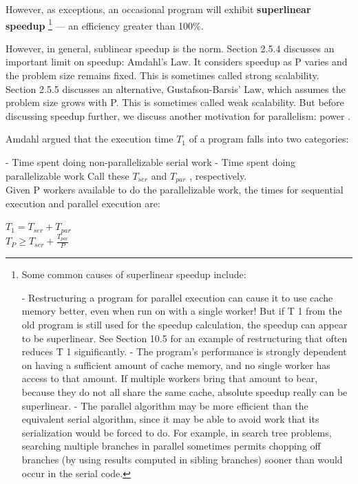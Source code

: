 However, as exceptions, an occasional program will exhibit \textbf{superlinear speedup} \footnote{Some common causes of superlinear speedup include:
	
	- Restructuring a program for parallel execution can cause it to use cache memory better, even when
	run on with a single worker! But if T 1 from the old program is still used for the speedup calculation,
	the speedup can appear to be superlinear. See Section 10.5 for an example of restructuring that often
	reduces T 1 significantly.
	- The program’s performance is strongly dependent on having a sufficient amount of cache memory,
	and no single worker has access to that amount. If multiple workers bring that amount to bear,
	because they do not all share the same cache, absolute speedup really can be superlinear.
	- The parallel algorithm may be more efficient than the equivalent serial algorithm, since it may be
	able to avoid work that its serialization would be forced to do. For example, in search tree problems,
	searching multiple branches in parallel sometimes permits chopping off branches (by using results
	computed in sibling branches) sooner than would occur in the serial code.} — an efficiency greater than 100\%. 

However, in general, sublinear speedup is the norm.
Section 2.5.4 discusses an important limit on speedup: Amdahl’s Law. It considers speedup as P varies and the problem size remains fixed. This is sometimes called strong scalability. Section 2.5.5 discusses an alternative, Gustafson-Barsis’ Law, which assumes the problem size grows with P.
This is sometimes called weak scalability. But before discussing speedup further, we discuss another
motivation for parallelism: power \cite{structparprog}.



Amdahl argued that the execution time \(T_{1}\) of a program falls into two categories:

- Time spent doing non-parallelizable serial work
- Time spent doing parallelizable work
Call these \(T_{ser}\) and \(T_{par}\) , respectively. \\
Given P workers available to do the parallelizable work, the times for sequential execution and parallel execution are:
\begin{center}
	\(T_{1} = T_{ser} + T_{par}\) \\
	\(T_{P} \geq T_{ser} + \frac{T_{par}}{P}\)
\end{center}

